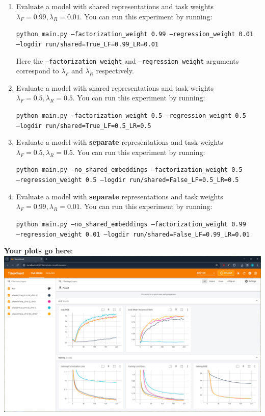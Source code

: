 \documentclass[12pt]{article}
\begin{document}
\begin{enumerate}
    \item Evaluate a model with shared representations and task weights $\lambda_F=0.99, \lambda_R=0.01$. You can run this experiment by running:
    
    \texttt{python main.py --factorization\_weight 0.99 --regression\_weight 0.01 \\--logdir run/shared=True\_LF=0.99\_LR=0.01}
    
    Here the \texttt{--factorization\_weight} and \texttt{--regression\_weight} arguments correspond to $\lambda_F$ and  $\lambda_R$ respectively.
    
    \item Evaluate a model with shared representations and task weights $\lambda_F=0.5, \lambda_R=0.5$. You can run this experiment by running:    
    
    \texttt{python main.py --factorization\_weight 0.5 --regression\_weight 0.5 \\--logdir run/shared=True\_LF=0.5\_LR=0.5}
    
    \item Evaluate a model with \textbf{separate} representations and task weights $\lambda_F=0.5, \lambda_R=0.5$. You can run this experiment by running:    
    
    \texttt{python main.py --no\_shared\_embeddings --factorization\_weight 0.5 \\ --regression\_weight 0.5 --logdir run/shared=False\_LF=0.5\_LR=0.5}
    
     \item Evaluate a model with \textbf{separate} representations and task weights $\lambda_F=0.99, \lambda_R=0.01$. You can run this experiment by running:    
    
    \texttt{python main.py --no\_shared\_embeddings --factorization\_weight 0.99 \\ --regression\_weight 0.01 --logdir run/shared=False\_LF=0.99\_LR=0.01}
    
\end{enumerate}

\noindent\textbf{Your plots go here}:\\
\includegraphics[width=\textwidth]{.png}
\end{document}
